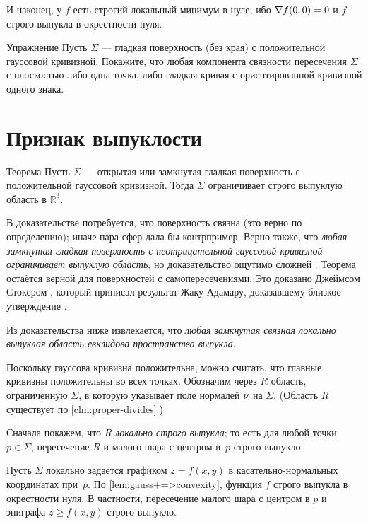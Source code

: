 {\sloppy

И наконец, у $f$ есть строгий локальный минимум в нуле,
ибо $\nabla f(0,0)\z=0$ и $f$ строго выпукла в окрестности нуля.
\qeds

}

\begin{thm}{Упражнение}\label{ex:section-of-convex}
Пусть $\Sigma$ --- гладкая поверхность (без края) с положительной гауссовой кривизной.
Покажите, что любая компонента связности пересечения $\Sigma$ с плоскостью либо одна точка, либо гладкая кривая с ориентированной кривизной одного знака.
\end{thm}

\section{Признак выпуклости}

\begin{thm}{Теорема}\label{thm:convex-embedded}
Пусть $\Sigma$ --- открытая или замкнутая гладкая поверхность с положительной гауссовой кривизной.
Тогда $\Sigma$ ограничивает строго выпуклую область в $\mathbb{R}^3$.
\end{thm}

В доказательстве потребуется, что поверхность связна (это верно по определению);
иначе пара сфер дала бы контрпример.
Верно также, что \textit{любая замкнутая гладкая поверхность с неотрицательной гауссовой кривизной ограничивает выпуклую область},
но доказательство ощутимо сложней \cite{hadamard,gomes,sacksteder}.
Теорема остаётся верной для поверхностей с самопересечениями. 
Это доказано Джеймсом Стокером \cite{stoker}, который приписал результат Жаку Адамару, доказавшему близкое утверждение \cite[§ 23]{hadamard}.

Из доказательства ниже извлекается, что \textit{любая замкнутая связная локально выпуклая область евклидова пространства выпукла}.


Поскольку гауссова кривизна положительна, можно считать, что главные кривизны положительны во всех точках.
Обозначим через $R$ область, ограниченную $\Sigma$, в которую указывает поле нормалей $\nu$ на $\Sigma$.
(Область $R$ существует по \ref{clm:proper-divides}.)

Сначала покажем, что $R$ {}\emph{локально строго выпукла};
то есть для любой точки $p\in \Sigma$, пересечение $R$ и малого шара с центром в~$p$ строго выпукло.

Пусть $\Sigma$ локально задаётся графиком $z=f(x,y)$ в касательно-нормальных координатах при~$p$.
По \ref{lem:gauss+=>convexity}, функция $f$ строго выпукла в окрестности нуля.
В частности, пересечение малого шара с центром в $p$ и эпиграфа $z\ge f(x,y)$ строго выпукло.

